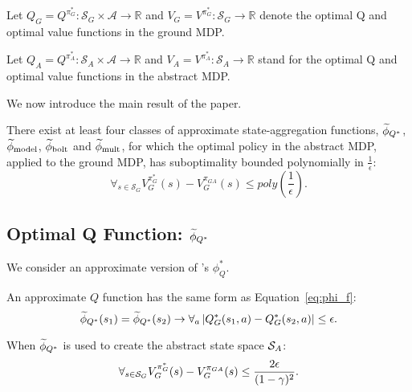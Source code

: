 Let $Q_G = Q^{\pi_G^*} : \mathcal{S}_G \times \mathcal{A} \rightarrow \mathbb{R} $ and $V_G = V^{\pi_G^*}: \mathcal{S}_G \rightarrow \mathbb{R} $ denote the optimal Q and optimal value functions in the ground \ac{MDP}.
\edefn

Let $Q_A  = Q^{\pi_A^*}: \mathcal{S}_A \times \mathcal{A} \rightarrow \mathbb{R}$ and $V_A  = V^{\pi_A^*}: \mathcal{S}_A \rightarrow \mathbb{R}$  stand for the optimal Q and optimal value functions in the abstract \ac{MDP}.
\edefn

We now introduce the main result of the paper.

\begin{thm}
There exist at least four classes of approximate state-aggregation functions, $\epQ$, $\widetilde \phi_{\text{model}}$, $\widetilde \phi_{\text{bolt}}$ and $\widetilde \phi_{\text{mult}}$, for which the optimal policy in the abstract \ac{MDP}, applied to the ground \ac{MDP}, has suboptimality bounded polynomially in $\frac{1}{\epsilon}$:
\begin{equation}
\forall_{s \in \mathcal{S}_G} V_G^{\pi_G^*}(s) - V_G^{\pi_{GA}}(s) \leq poly \left (\frac{1}{\epsilon} \right).
\end{equation}
\end{thm}




\subsection{Optimal Q Function: $\widetilde \phi_{Q^*}$}
\label{sec:Q*}

We consider an approximate version of \citeauthor{li2006towards}'s $\phi_Q^*$. 

\bdefn{$\epQ$}
An approximate $Q$ function has the same form as Equation~\ref{eq:phi_f}:
\begin{equation}
\widetilde \phi_{Q^*}(s_1) = \widetilde \phi_{Q^*}(s_2) \rightarrow \forall_a \left|Q_G^*(s_1, a) - Q_G^*(s_2, a)\right| \leq \epsilon.
\end{equation}
\edefn

\begin{lma}
\label{lma:Q*}
When $\widetilde \phi_{Q^*}$ is used to create the abstract state space $\mathcal{S}_A$:
\begin{equation}
\forall_{s \in \mathcal{S}_G} V_G^{\pi_G^*}(s) - V_G^{\pi_{GA}}(s) \leq \frac{2\epsilon}{(1-\gamma)^2}.
\end{equation}
\end{lma}

